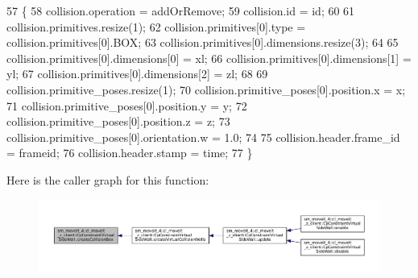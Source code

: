 \begin{DoxyCode}
57         \{
58             collision.operation = addOrRemove;
59             collision.id = id;
60 
61             collision.primitives.resize(1);
62             collision.primitives[0].type = collision.primitives[0].BOX;
63             collision.primitives[0].dimensions.resize(3);
64 
65             collision.primitives[0].dimensions[0] = xl;
66             collision.primitives[0].dimensions[1] = yl;
67             collision.primitives[0].dimensions[2] = zl;
68 
69             collision.primitive\_poses.resize(1);
70             collision.primitive\_poses[0].position.x = x;
71             collision.primitive\_poses[0].position.y = y;
72             collision.primitive\_poses[0].position.z = z;
73             collision.primitive\_poses[0].orientation.w = 1.0;
74 
75             collision.header.frame\_id = frameid;
76             collision.header.stamp = time;
77         \}
\end{DoxyCode}
Here is the caller graph for this function\+:
\nopagebreak
\begin{figure}[H]
\begin{center}
\leavevmode
\includegraphics[width=350pt]{classsm__moveit__4_1_1cl__moveit__z__client_1_1CpConstraintVirtualSideWall_a9f08de3e14d64a3b23e32c255cf67b4d_icgraph}
\end{center}
\end{figure}
\mbox{\label{classsm__moveit__4_1_1cl__moveit__z__client_1_1CpConstraintVirtualSideWall_a98bd6187825c00d9d6fca3ab4e1a1c5d}} 
